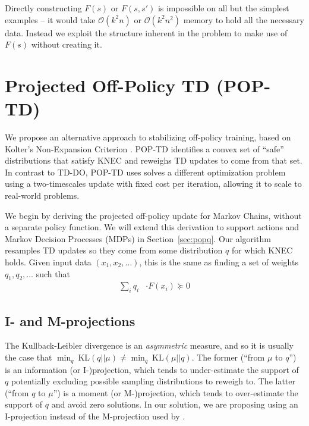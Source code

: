 Directly constructing $F(s)$ or $F(s, s')$ is impossible on all but the simplest examples -- it would take $\mathcal O(k^2n)$ or $\mathcal O(k^2n^2)$ memory to hold all the necessary data. Instead we exploit the structure inherent in the problem to make use of $F(s)$ without creating it.



\section{Projected Off-Policy TD (POP-TD) }

We propose an alternative approach to stabilizing off-policy training, based on Kolter's Non-Expansion Criterion \citep{kolter2011fixed}. POP-TD identifies a convex set of ``safe'' distributions that satisfy KNEC and reweighs TD updates to come from that set. In contrast to TD-DO, POP-TD uses solves a different optimization problem using a two-timescales update with fixed cost per iteration, allowing it to scale to real-world problems.

We begin by deriving the projected off-policy update for Markov Chains, without a separate policy function. We will extend this derivation to support actions and Markov Decision Processes (MDPs) in Section~\ref{sec:popq}. Our algorithm resamples TD updates so they come from some distribution $q$ for which KNEC holds. Given input data $(x_1, x_2, \ldots)$, this is the same as finding a set of weights $q_1, q_2, \ldots$ such that
\begin{align}
  \sum_i q_i & \cdot F(x_i) \succcurlyeq 0
\end{align}


\subsection{I- and M-projections} \label{sec:improj}
The Kullback-Leibler divergence is an \emph{asymmetric} measure, and so it is usually the case that $\min_q~\text{KL}(q||\mu) \neq \min_q~\text{KL}(\mu||q)$. The former (``from $\mu$ to $q$'') is an information (or I-)projection, which tends to under-estimate the support of $q$ potentially excluding possible sampling distributions to reweigh to. The latter (``from $q$ to $\mu$'') is a moment (or M-)projection, which tends to over-estimate the support of $q$ and avoid zero solutions. In our solution, we are proposing using an I-projection instead of the M-projection used by \citet{kolter2011fixed}.


